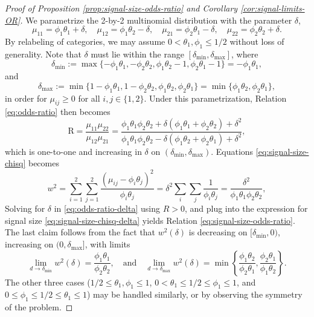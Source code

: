 \begin{proof}[Proof of Proposition \ref{prop:signal-size-odds-ratio} and Corollary \ref{cor:signal-limits-OR}]
We parametrize the 2-by-2 multinomial distribution with the parameter $\delta$, 
\begin{equation} \label{eq:reparametrize-2-by-2-table-1}
    \mu_{11} = \phi_1\theta_1+\delta,\quad 
    \mu_{12} = \phi_1\theta_2-\delta,\quad 
    \mu_{21} = \phi_2\theta_1-\delta,\quad 
    \mu_{22} = \phi_2\theta_2+\delta.
\end{equation}
By relabeling of categories, we may assume $0<\theta_1,\phi_1\le1/2$ without loss of generality.
Note that $\delta$ must lie within the range $[\delta_\mathrm{min}, \delta_\mathrm{max}]$, where
$$
\delta_\mathrm{min} := \max\{-\phi_1\theta_1, -\phi_2\theta_2, \phi_1\theta_2-1, \phi_2\theta_1-1\} 
= -\phi_1\theta_1,
$$
and
$$
\delta_\mathrm{max} := \min\{1-\phi_1\theta_1, 1-\phi_2\theta_2, \phi_1\theta_2, \phi_2\theta_1\}
= \min\{\phi_1\theta_2, \phi_2\theta_1\},
$$
in order for $\mu_{ij}\ge0$ for all $i,j\in \{1,2\}$.
Under this parametrization, Relation \eqref{eq:odds-ratio} then becomes
\begin{equation} \label{eq:odds-ratio-delta}
    \text{R} = \frac{\mu_{11}\mu_{22}}{\mu_{12}\mu_{21}}
    = \frac{\phi_1\theta_1\phi_2\theta_2 + \delta(\phi_1\theta_1+\phi_2\theta_2)+\delta^2}{\phi_1\theta_1\phi_2\theta_2 - \delta(\phi_1\theta_2+\phi_2\theta_1)+\delta^2},
\end{equation}
which is one-to-one and increasing in $\delta$ on $(\delta_\mathrm{min}, \delta_\mathrm{max})$.
Equations \eqref{eq:signal-size-chisq} becomes
\begin{equation} \label{eq:signal-size-chisq-delta}
w^2 = \sum_{i=1}^2 \sum_{j=1}^2 \frac{(\mu_{ij} - \phi_i\theta_j)^2}{\phi_i\theta_j}
= \delta^2\sum_i\sum_j \frac{1}{\phi_i\theta_j}
= \frac{\delta^2}{\phi_1\theta_1\phi_2\theta_2},
\end{equation}
Solving for $\delta$ in \eqref{eq:odds-ratio-delta} using $R>0$, and plug into the expression for signal size \eqref{eq:signal-size-chisq-delta} yields Relation \eqref{eq:signal-size-odds-ratio}.
The last claim follows from the fact that $w^2(\delta)$ is decreasing on $[\delta_\mathrm{min},0)$, increasing on $(0,\delta_\mathrm{max}]$, with limits
$$
\lim_{d\to \delta_\mathrm{min}} w^2(\delta) = \frac{\phi_1\theta_1}{\phi_2\theta_2},
\quad
\text{and}
\quad
\lim_{d\to \delta_\mathrm{max}} w^2(\delta) = \min\left\{\frac{\phi_1\theta_2}{\phi_2\theta_1}, \frac{\phi_2\theta_1}{\phi_1\theta_2}\right\}.
$$
The other three cases ($1/2\le\theta_1,\phi_1\le1$, $0<\theta_1\le1/2\le\phi_1\le1$, and $0\le\phi_1\le1/2\le\theta_1\le1$) may be handled similarly, or by observing the symmetry of the problem.
\end{proof}

